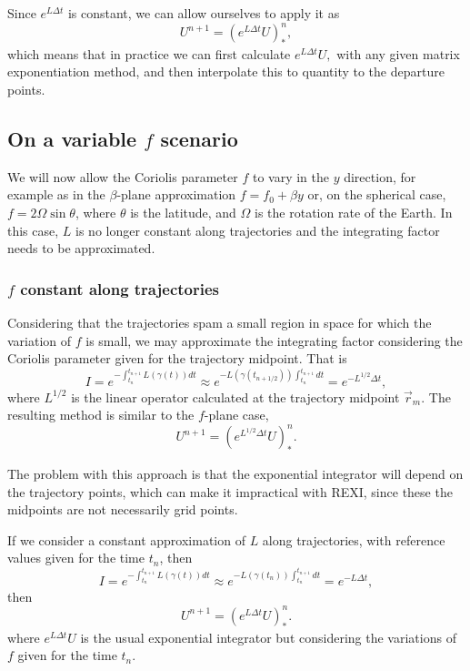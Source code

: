 \documentclass[10pt,a4paper]{article}
\begin{document}
Since $e^{L\Delta t}$ is constant, we can allow ourselves to apply it as  
\begin{equation}
U^{n+1}=(e^{L\Delta t} U)^{n}_{*},
\end{equation}
which means that in practice we can first calculate 
$
e^{L\Delta t} U,
$
with any given matrix exponentiation method, and then interpolate this to quantity to the departure points.


\subsection{On a variable $f$ scenario}

We will now allow the Coriolis parameter $f$ to vary in the $y$ direction, for example as in the $\beta$-plane approximation $f=f_0+\beta y$ or, on the spherical case, $f=2\Omega \sin \theta$, where $\theta$ is the latitude, and $\Omega$ is the rotation rate of the Earth. In this case, $L$ is no longer constant along trajectories and the integrating factor needs to be approximated. 

\subsubsection{$f$ constant along trajectories}

Considering that the trajectories spam a small region in space for which the variation of $f$ is small, we may approximate the integrating factor considering the Coriolis parameter given for the trajectory midpoint. That is
\begin{equation}
I=e^{-\int_{t_n}^{t_{n+1}}L(\gamma(t))dt}  \approx e^{-L(\gamma(t_{n+1/2})) \int_{t_n}^{t_{n+1}}dt} = e^{-L^{1/2}\Delta t},
\end{equation}
 where $L^{1/2}$ is the linear operator calculated at the trajectory midpoint $\vec{r}_m$. The resulting method is similar to the $f$-plane case,
\begin{equation}
U^{n+1}=(e^{L^{1/2}\Delta t} U)^{n}_{*}.
\end{equation}
 
The problem with this approach is that the exponential integrator will depend on the trajectory points, which can make it impractical with REXI, since these the midpoints are not necessarily grid points. 

If we consider a constant approximation of $L$ along trajectories, with reference values given for the time $t_n$, then 
\begin{equation}
I=e^{-\int_{t_n}^{t_{n+1}}L(\gamma(t))dt} \approx e^{-L(\gamma(t_n))\int_{t_n}^{t_{n+1}}dt} = e^{-L \Delta t},
\end{equation}
then
\begin{equation}
U^{n+1}=(e^{L \Delta t} U)^{n}_{*}.
\end{equation}
where $e^{L \Delta t} U$ is the usual exponential integrator but considering the variations of $f$ given for the time $t_n$. 
\end{document}
